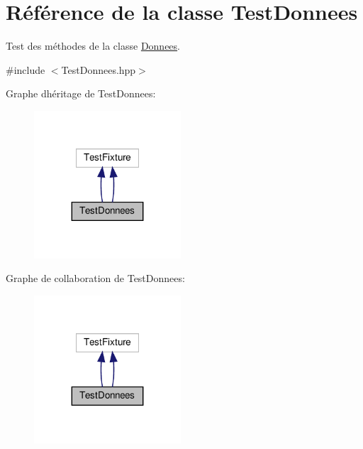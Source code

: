 \hypertarget{class_test_donnees}{}\section{Référence de la classe Test\+Donnees}
\label{class_test_donnees}


Test des méthodes de la classe \hyperlink{class_donnees}{Donnees}.  




{\ttfamily \#include $<$Test\+Donnees.\+hpp$>$}



Graphe d\textquotesingle{}héritage de Test\+Donnees\+:\nopagebreak
\begin{figure}[H]
\begin{center}
\leavevmode
\includegraphics[width=155pt]{class_test_donnees__inherit__graph}
\end{center}
\end{figure}


Graphe de collaboration de Test\+Donnees\+:\nopagebreak
\begin{figure}[H]
\begin{center}
\leavevmode
\includegraphics[width=155pt]{class_test_donnees__coll__graph}
\end{center}
\end{figure}
